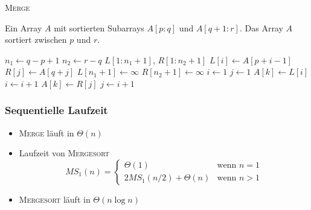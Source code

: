 \begin{frame}
    \begin{algorithm}[H]
        \caption{{\rmfamily \textsc{Merge}} \cite[S.31]{cormen}}
        \label{alg:merge}
        \begin{algorithmic}[1]
            \Require Ein Array $A$ mit sortierten Subarrays $A[p:q]$ und
                $A[q+1:r]$.
            \Ensure Das Array $A$ sortiert zwischen $p$ und $r$.
            \setlength\multicolsep{0pt}
            \begin{multicols}{2}
                \State $n_1 \gets q - p + 1$
                \State $n_2 \gets r - q$
                \State $L[1:n_1 +1]$, $R[1:n_2 + 1]$
                    \State $L[i] \gets A[p + i - 1]$
                \EndFor
                    \State $R[j] \gets A[q + j]$
                \EndFor
                \State $L[n_1 + 1] \gets \infty$
                \State $R[n_2 + 1] \gets \infty$
                \State $i \gets 1$
                \State $j \gets 1$
                        \State $A[k] \gets L[i]$
                        \State $i \gets i + 1$
                    \Else
                        \State $A[k] \gets R[j]$
                        \State $j \gets i + 1$
                    \EndIf
                \EndFor
            \end{multicols}
        \end{algorithmic}
    \end{algorithm}
\end{frame}

\begin{frame}
    \frametitle{Sequentielle Laufzeit}
    \begin{itemize}
        \item {\rmfamily \textsc{Merge}} läuft in $\Theta(n)$
        \item Laufzeit von {\rmfamily \textsc{Mergesort}}
            \begin{equation}
                MS_1(n) = \begin{cases}
                    \Theta(1) & \text{wenn } n = 1 \\
                    2MS_1(n/2) + \Theta(n) & \text{wenn } n > 1
                \end{cases}
            \end{equation}
        \item {\rmfamily \textsc{Mergesort}} läuft in $\Theta(n \log n)$
    \end{itemize}
\end{frame}

